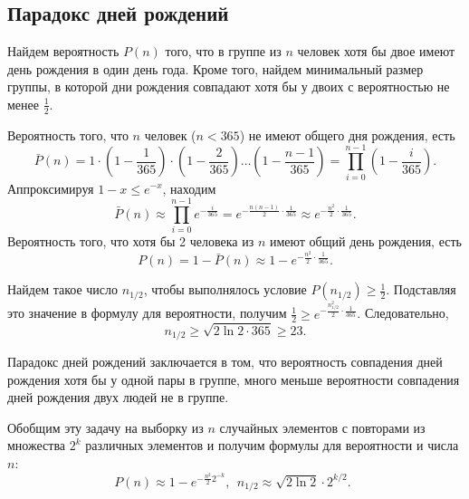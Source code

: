 \subsection{Парадокс дней рождений}

Найдем вероятность $P(n)$ того, что в группе из $n$ человек хотя бы двое имеют день рождения в один день года. Кроме того, найдем минимальный размер группы, в которой дни рождения совпадают хотя бы у двоих с вероятностью не менее $\frac{1}{2}$.

Вероятность того, что $n$ человек ($n < 365$) не имеют общего дня рождения, есть
\[
    \bar{P}(n) = 1 \cdot \left( 1 - \frac{1}{365} \right) \cdot \left(1 - \frac{2}{365} \right)  \dots  \left( 1 - \frac{n-1}{365} \right) = \prod\limits_{i=0}^{n-1} \left( 1 - \frac{i}{365} \right).
\]
Аппроксимируя $1-x \leq e^{-x}$, находим
    \[ \bar{P}(n) \approx \prod\limits_{i=0}^{n-1} e^{-\frac{i}{365}} = e^{-\frac{n(n-1)}{2} \cdot \frac{1}{365}} \approx e^{-\frac{n^2}{2} \cdot \frac{1}{365}}. \]
Вероятность того, что хотя бы 2 человека из $n$ имеют общий день рождения, есть
    \[ P(n) = 1 - \bar{P}(n) \approx 1 -  e^{-\frac{n^2}{2} \cdot \frac{1}{365}}. \]

Найдем такое число $n_{1/2}$, чтобы выполнялось условие $P(n_{1/2}) \geq \frac{1}{2}$. Подставляя это значение в формулу для вероятности, получим $\frac{1}{2} \geq e^{-\frac{n_{1/2}^2}{2} \cdot \frac{1}{365}}$. Следовательно,
\[
    n_{1/2} \geq \sqrt{2 \ln 2 \cdot 365} \geq 23.
\]

Парадокс дней рождений заключается в том, что вероятность совпадения дней рождения хотя бы у одной пары в группе, много меньше вероятности совпадения дней рождения двух людей не в группе.


Обобщим эту задачу на выборку из $n$ случайных элементов с повторами из множества  $2^k$ различных элементов и получим формулы для вероятности и числа $n$:
\[
    P(n) \approx 1 -  e^{-\frac{n^2}{2} 2^{-k}}, ~~
    n_{1/2} \approx \sqrt{2 \ln 2} \cdot 2^{k/2}. ~~
\]
